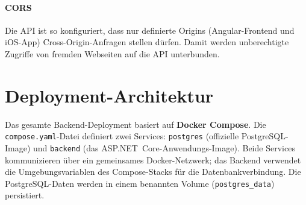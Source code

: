 \paragraph{CORS}
Die API ist so konfiguriert, dass nur definierte Origins (Angular-Frontend und iOS-App)
Cross-Origin-Anfragen stellen dürfen. Damit werden unberechtigte Zugriffe von fremden
Webseiten auf die API unterbunden.

\section{Deployment-Architektur}
\label{sec:deployment}

Das gesamte Backend-Deployment basiert auf \textbf{Docker Compose}. Die
\texttt{compose.yaml}-Datei definiert zwei Services: \texttt{postgres} (offizielle
PostgreSQL-Image) und \texttt{backend} (das ASP.NET~Core-Anwendungs-Image). Beide Services
kommunizieren über ein gemeinsames Docker-Netzwerk; das Backend verwendet die Umgebungsvariablen
des Compose-Stacks für die Datenbankverbindung. Die PostgreSQL-Daten werden in einem benannten
Volume (\texttt{postgres\_data}) persistiert.
